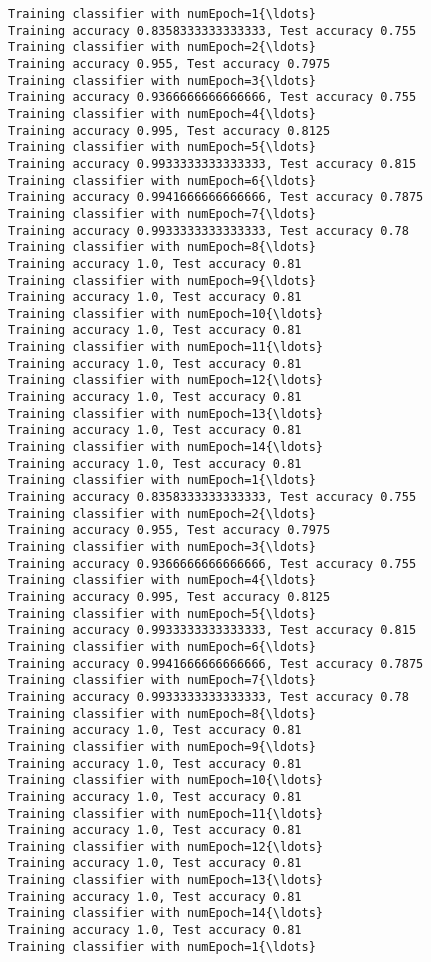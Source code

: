 \documentclass[11pt]{article}
\begin{document}
\begin{Verbatim}[commandchars=\\\{\}]
Training classifier with numEpoch=1{\ldots}
Training accuracy 0.8358333333333333, Test accuracy 0.755
Training classifier with numEpoch=2{\ldots}
Training accuracy 0.955, Test accuracy 0.7975
Training classifier with numEpoch=3{\ldots}
Training accuracy 0.9366666666666666, Test accuracy 0.755
Training classifier with numEpoch=4{\ldots}
Training accuracy 0.995, Test accuracy 0.8125
Training classifier with numEpoch=5{\ldots}
Training accuracy 0.9933333333333333, Test accuracy 0.815
Training classifier with numEpoch=6{\ldots}
Training accuracy 0.9941666666666666, Test accuracy 0.7875
Training classifier with numEpoch=7{\ldots}
Training accuracy 0.9933333333333333, Test accuracy 0.78
Training classifier with numEpoch=8{\ldots}
Training accuracy 1.0, Test accuracy 0.81
Training classifier with numEpoch=9{\ldots}
Training accuracy 1.0, Test accuracy 0.81
Training classifier with numEpoch=10{\ldots}
Training accuracy 1.0, Test accuracy 0.81
Training classifier with numEpoch=11{\ldots}
Training accuracy 1.0, Test accuracy 0.81
Training classifier with numEpoch=12{\ldots}
Training accuracy 1.0, Test accuracy 0.81
Training classifier with numEpoch=13{\ldots}
Training accuracy 1.0, Test accuracy 0.81
Training classifier with numEpoch=14{\ldots}
Training accuracy 1.0, Test accuracy 0.81
Training classifier with numEpoch=1{\ldots}
Training accuracy 0.8358333333333333, Test accuracy 0.755
Training classifier with numEpoch=2{\ldots}
Training accuracy 0.955, Test accuracy 0.7975
Training classifier with numEpoch=3{\ldots}
Training accuracy 0.9366666666666666, Test accuracy 0.755
Training classifier with numEpoch=4{\ldots}
Training accuracy 0.995, Test accuracy 0.8125
Training classifier with numEpoch=5{\ldots}
Training accuracy 0.9933333333333333, Test accuracy 0.815
Training classifier with numEpoch=6{\ldots}
Training accuracy 0.9941666666666666, Test accuracy 0.7875
Training classifier with numEpoch=7{\ldots}
Training accuracy 0.9933333333333333, Test accuracy 0.78
Training classifier with numEpoch=8{\ldots}
Training accuracy 1.0, Test accuracy 0.81
Training classifier with numEpoch=9{\ldots}
Training accuracy 1.0, Test accuracy 0.81
Training classifier with numEpoch=10{\ldots}
Training accuracy 1.0, Test accuracy 0.81
Training classifier with numEpoch=11{\ldots}
Training accuracy 1.0, Test accuracy 0.81
Training classifier with numEpoch=12{\ldots}
Training accuracy 1.0, Test accuracy 0.81
Training classifier with numEpoch=13{\ldots}
Training accuracy 1.0, Test accuracy 0.81
Training classifier with numEpoch=14{\ldots}
Training accuracy 1.0, Test accuracy 0.81
Training classifier with numEpoch=1{\ldots}

\end{Verbatim}
\end{document}
